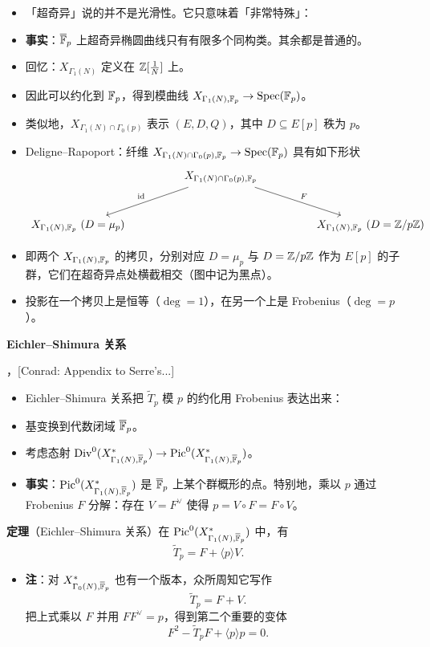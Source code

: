 \begin{itemize}
\item 「超奇异」说的并不是光滑性。它只意味着「非常特殊」：
\item \textbf{事实}：$\overline{\mathbb{F}}_p$ 上超奇异椭圆曲线只有有限多个同构类。其余都是普通的。
\item 回忆：$X_{\Gamma_1(N)}$ 定义在 $\mathbb{Z}[\frac1N]$ 上。
\item 因此可以约化到 $\mathbb{F}_p$，得到模曲线 $X_{\Gamma_1(N),\mathbb{F}_p}\to\operatorname{Spec}(\mathbb{F}_p)$。
\item 类似地，$X_{\Gamma_1(N)\cap\Gamma_0(p)}$ 表示 $(E,D,Q)$，其中 $D\subseteq E[p]$ 秩为 $p$。
\item Deligne--Rapoport：纤维 $X_{\Gamma_1(N)\cap\Gamma_0(p),\mathbb{F}_p}\to\operatorname{Spec}(\mathbb{F}_p)$ 具有如下形状
\[
\begin{tikzcd}[column sep=4.6em, row sep=2.6em]
& X_{\Gamma_1(N)\cap\Gamma_0(p),\F_p}\arrow[dl,"\mathrm{id}"']\arrow[dr,"F"] &\\
X_{\Gamma_1(N),\F_p}\ (D=\mu_p) & & X_{\Gamma_1(N),\F_p}\ (D=\Z/p\Z)
\end{tikzcd}
\]
\item 即两个 $X_{\Gamma_1(N),\mathbb{F}_p}$ 的拷贝，分别对应 $D=\mu_p$ 与 $D=\mathbb{Z}/p\mathbb{Z}$ 作为 $E[p]$ 的子群，它们在超奇异点处横截相交（图中记为黑点）。
\item 投影在一个拷贝上是恒等（$\deg=1$），在另一个上是 Frobenius（$\deg=p$）。
\end{itemize}

\medskip
\noindent\textbf{Eichler--Shimura 关系}

，[Conrad: Appendix to Serre's...]
\begin{itemize}
\item Eichler--Shimura 关系把 $\tilde T_p$ 模 $p$ 的约化用 Frobenius 表达出来：
\item 基变换到代数闭域 $\overline{\mathbb{F}}_p$。
\item 考虑态射 $\operatorname{Div}^0(X^*_{\Gamma_1(N),\overline{\mathbb{F}}_p})\to\operatorname{Pic}^0(X^*_{\Gamma_1(N),\overline{\mathbb{F}}_p})$。
\item \textbf{事实}：$\operatorname{Pic}^0(X^*_{\Gamma_1(N),\overline{\mathbb{F}}_p})$ 是 $\overline{\mathbb{F}}_p$ 上某个群概形的点。特别地，乘以 $p$ 通过 Frobenius $F$ 分解：存在 $V=F^\vee$ 使得 $p=V\circ F=F\circ V$。
\end{itemize}

\noindent\textbf{定理}（Eichler--Shimura 关系）\quad 在 $\operatorname{Pic}^0(X^*_{\Gamma_1(N),\overline{\mathbb{F}}_p})$ 中，有
\[
\tilde T_p=F+\langle p\rangle V .
\]
\begin{itemize}
\item \textbf{注}：对 $X^*_{\Gamma_0(N),\overline{\mathbb{F}}_p}$ 也有一个版本，众所周知它写作
\[
\tilde T_p=F+V .
\]
把上式乘以 $F$ 并用 $FF^\vee=p$，得到第二个重要的变体
\[
F^2-\tilde T_pF+\langle p\rangle p=0 .
\]
\end{itemize}

